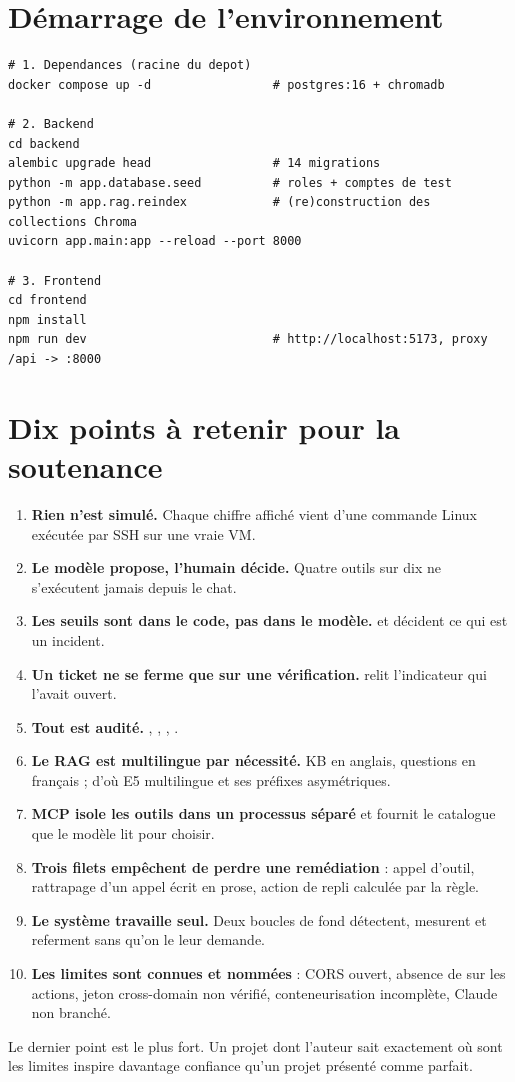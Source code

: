 \section{Démarrage de l'environnement}

\begin{lstlisting}[caption={Séquence complète, d'après le code et .claude/launch.json}]
# 1. Dependances (racine du depot)
docker compose up -d                 # postgres:16 + chromadb

# 2. Backend
cd backend
alembic upgrade head                 # 14 migrations
python -m app.database.seed          # roles + comptes de test
python -m app.rag.reindex            # (re)construction des collections Chroma
uvicorn app.main:app --reload --port 8000

# 3. Frontend
cd frontend
npm install
npm run dev                          # http://localhost:5173, proxy /api -> :8000
\end{lstlisting}

\section{Dix points à retenir pour la soutenance}

\begin{enumerate}
  \item \textbf{Rien n'est simulé.} Chaque chiffre affiché vient d'une commande
  Linux exécutée par SSH sur une vraie VM.
  \item \textbf{Le modèle propose, l'humain décide.} Quatre outils sur dix ne
  s'exécutent jamais depuis le chat.
  \item \textbf{Les seuils sont dans le code, pas dans le modèle.}
   et  décident ce qui est un incident.
  \item \textbf{Un ticket ne se ferme que sur une vérification.}
   relit l'indicateur qui l'avait ouvert.
  \item \textbf{Tout est audité.} , ,
  , .
  \item \textbf{Le RAG est multilingue par nécessité.} KB en anglais, questions
  en français ; d'où E5 multilingue et ses préfixes asymétriques.
  \item \textbf{MCP isole les outils dans un processus séparé} et fournit le
  catalogue que le modèle lit pour choisir.
  \item \textbf{Trois filets empêchent de perdre une remédiation} : appel
  d'outil, rattrapage d'un appel écrit en prose, action de repli calculée par la
  règle.
  \item \textbf{Le système travaille seul.} Deux boucles de fond détectent,
  mesurent et referment sans qu'on le leur demande.
  \item \textbf{Les limites sont connues et nommées} : CORS ouvert, absence de
   sur les actions, jeton cross-domain non vérifié,
  conteneurisation incomplète, Claude non branché.
\end{enumerate}

\begin{keybox}
Le dernier point est le plus fort. Un projet dont l'auteur sait exactement où
sont les limites inspire davantage confiance qu'un projet présenté comme
parfait.
\end{keybox}
